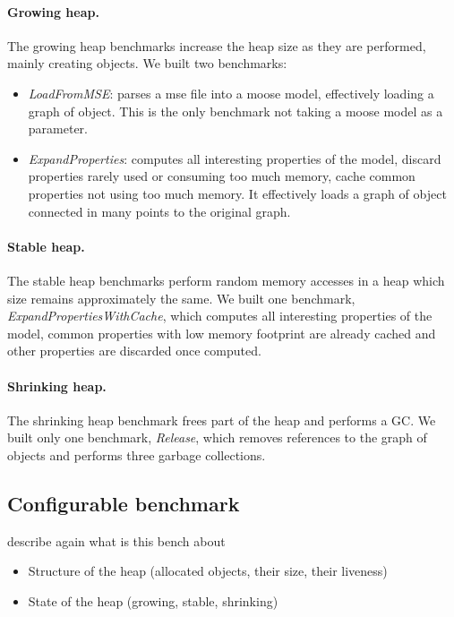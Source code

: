 \documentclass[10pt, sigplan]{acmart}
\newcommand{\todo}[1]{\color{orange}\fbox{\bfseries\sffamily\scriptsize TODO:}{\sf\small$\blacktriangleright$\textit{#1}$\blacktriangleleft$}\color{black}}
\begin{document}
\paragraph{Growing heap.} The growing heap benchmarks increase the heap size as they are performed, mainly creating objects. We built two benchmarks:
\begin{itemize}
	\item \emph{LoadFromMSE}: parses a mse file into a moose model, effectively loading a graph of object. This is the only benchmark not taking a moose model as a parameter.
	\item \emph{ExpandProperties}: computes all interesting properties of the model, discard properties rarely used or consuming too much memory, cache common properties not using too much memory. It effectively loads a graph of object connected in many points to the original graph. 
\end{itemize}

\paragraph{Stable heap.} The stable heap benchmarks perform random memory accesses in a heap which size remains approximately the same. We built one benchmark, \emph{ExpandPropertiesWithCache}, which computes all interesting properties of the model, common properties with low memory footprint are already cached and other properties are discarded once computed.

\paragraph{Shrinking heap.} The shrinking heap benchmark frees part of the heap and performs a GC. We built only one benchmark, \emph{Release}, which removes references to the graph of objects and performs three garbage collections.

\subsection{Configurable benchmark}
\label{sec:confBench}

\todo{Sophie}
describe again what is this bench about

\begin{itemize}
\item Structure of the heap (allocated objects, their size, their liveness)
\item State of the heap (growing, stable, shrinking)
\end{itemize}
\end{document}

